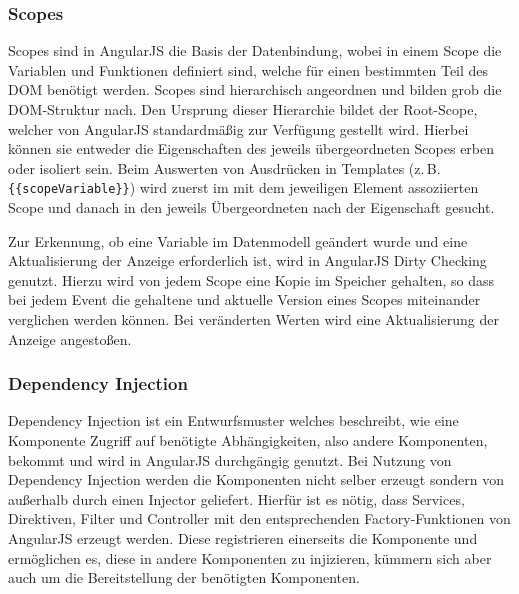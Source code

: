 \subsubsection{Scopes}
\label{sec:scopes}
Scopes sind in AngularJS die Basis der Datenbindung, wobei in einem Scope die Variablen und Funktionen definiert sind, welche für einen bestimmten Teil des DOM benötigt werden. Scopes sind hierarchisch angeordnen und bilden grob die DOM-Struktur nach. Den Ursprung dieser Hierarchie bildet der Root-Scope, welcher von AngularJS standardmäßig zur Verfügung gestellt wird. Hierbei können sie entweder die Eigenschaften des jeweils übergeordneten Scopes erben oder isoliert sein. Beim Auswerten von Ausdrücken in Templates (z.\,B. \texttt{\{\{scopeVariable\}\}}) wird zuerst im mit dem jeweiligen Element assoziierten Scope und danach in den jeweils Übergeordneten nach der Eigenschaft gesucht.\cites[23\psqq]{angular-boehm}[]{angular-scopes}

Zur Erkennung, ob eine Variable im Datenmodell geändert wurde und eine Aktualisierung der Anzeige erforderlich ist, wird in AngularJS Dirty Checking genutzt. Hierzu wird von jedem Scope eine Kopie im Speicher gehalten, so dass bei jedem Event die gehaltene und aktuelle Version eines Scopes miteinander verglichen werden können. Bei veränderten Werten wird eine Aktualisierung der Anzeige angestoßen.\cites[24]{angular-boehm}[]{angular-dirty}

\subsubsection{Dependency Injection}
Dependency Injection ist ein Entwurfsmuster welches beschreibt, wie eine Komponente Zugriff auf benötigte Abhängigkeiten, also andere Komponenten, bekommt und wird in AngularJS durchgängig genutzt. Bei Nutzung von Dependency Injection werden die Komponenten nicht selber erzeugt sondern von außerhalb durch einen Injector geliefert. Hierfür ist es nötig, dass Services, Direktiven, Filter und Controller mit den entsprechenden Factory-Funktionen von AngularJS erzeugt werden. Diese registrieren einerseits die Komponente und ermöglichen es, diese in andere Komponenten zu injizieren, kümmern sich aber auch um die Bereitstellung der benötigten Komponenten. \cite{angular-di}

\begin{figure}
	
\end{figure}

